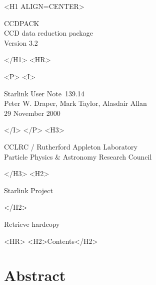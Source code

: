 \documentclass[twoside,11pt]{article}
\newcommand{\stardoccategory}  {Starlink User Note}
\newcommand{\stardocsource}    {sun\stardocnumber}
\newcommand{\stardocnumber}    {139.14}
\newcommand{\stardocauthors}   {Peter W. Draper, Mark Taylor, Alasdair Allan}
\newcommand{\stardocdate}      {29 November 2000}
\newcommand{\stardoctitle}     {CCDPACK}
\newcommand{\stardoconeline}   {CCD data reduction package}
\newcommand{\stardocversion}   {Version 3.2}
\newcommand{\htmladdnormallink}[2]{#1}
\newcommand{\htmladdimg}[1]{}
\newcommand{\htmlref}[2]{#1}
\newcommand{\htmladdtonavigation}[1]{}
\newcommand{\xlabel}[1]{}
\renewcommand{\_}{\texttt{\symbol{95}}}
\begin{document}
\begin{htmlonly}
   \xlabel{}
   \begin{rawhtml} <H1 ALIGN=CENTER> \end{rawhtml}
      \stardoctitle\\
      \stardoconeline \\
      \stardocversion

      \htmladdimg{main.gif}
   \begin{rawhtml} </H1> <HR> \end{rawhtml}


   \begin{rawhtml} <P> <I> \end{rawhtml}
   \stardoccategory\ \stardocnumber \\
   \stardocauthors \\
   \stardocdate
   \begin{rawhtml} </I> </P> <H3> \end{rawhtml}
      \htmladdnormallink{CCLRC}{http://www.cclrc.ac.uk} /
      \htmladdnormallink{Rutherford Appleton Laboratory}
                        {http://www.cclrc.ac.uk/ral} \\
      \htmladdnormallink{Particle Physics \& Astronomy Research Council}
                        {http://www.pparc.ac.uk} \\
   \begin{rawhtml} </H3> <H2> \end{rawhtml}
      \htmladdnormallink{Starlink Project}{http://star-www.rl.ac.uk/}
   \begin{rawhtml} </H2> \end{rawhtml}
   \htmladdnormallink{\htmladdimg{source.gif} Retrieve hardcopy}
      {http://star-www.rl.ac.uk/cgi-bin/hcserver?\stardocsource}\\

  \label{stardoccontents}
  \begin{rawhtml} 
    <HR>
    <H2>Contents</H2>
  \end{rawhtml}
  \htmladdtonavigation{\htmlref{\htmladdimg{contents_motif.gif}}
        {stardoccontents}}

  \section{\xlabel{abstract}Abstract}
\end{htmlonly}
\end{document}
